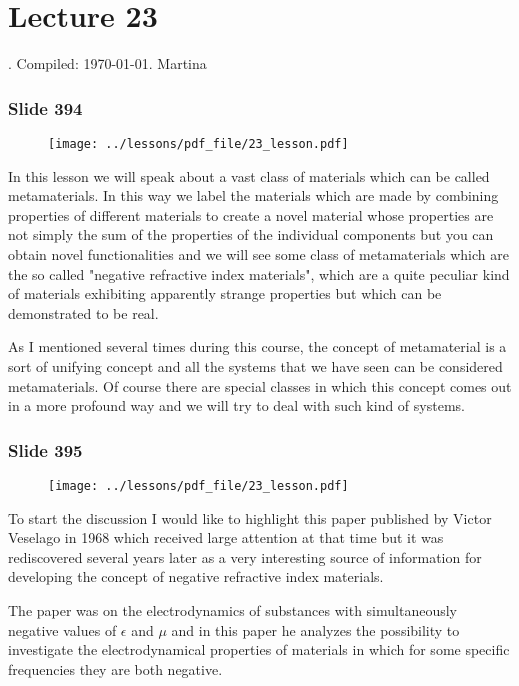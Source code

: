 \documentclass[../main/main.tex]{subfiles}
\begin{document}
\section{Lecture 23}
 . Compiled:  \today. Martina 

\subsubsection{Slide 394}

\begin{figure}[h!]
\centering
\texttt{[image: ../lessons/pdf\_file/23\_lesson.pdf]}
\end{figure}

In this lesson we will speak about a vast class of materials which can be called metamaterials. In this way we label the materials which are made by combining properties of different materials to create a novel material whose properties are not simply the sum of the properties of the individual components but you can obtain novel functionalities and we will see some class of metamaterials which are the so called "negative refractive index materials", which are a quite peculiar kind of materials exhibiting apparently strange properties but which can be demonstrated to be real.

As I mentioned several times during this course, the concept of metamaterial is a sort of unifying concept and all the systems that we have seen can be considered metamaterials. Of course there are special classes in which this concept comes out in a more profound way and we will try to deal with such kind of systems.

\newpage

\subsubsection{Slide 395}

\begin{figure}[h!]
\centering
\texttt{[image: ../lessons/pdf\_file/23\_lesson.pdf]}
\end{figure}

To start the discussion I would like to highlight this paper published by Victor Veselago in 1968 which received large attention at that time but it was rediscovered several years later as a very interesting source of information for developing the concept of negative refractive index materials. 

The paper was on the electrodynamics of substances with simultaneously negative values of $\epsilon$ and $\mu$ and in this paper he analyzes the possibility to investigate the electrodynamical properties of materials in which for some specific frequencies they are both negative.
\end{document}
